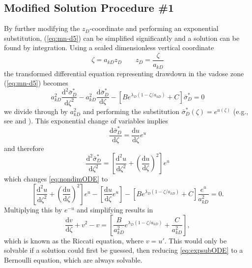 \documentclass[12pt,letterpaper]{article}
\begin{document}
\subsection{Modified Solution Procedure \#1} 
By further modifying the $z_D$-coordinate and performing an exponential substitution, (\ref{eq:mn-d5}) can be simplified significantly and a solution can be found by integration.  Using a scaled dimensionless vertical coordinate 
\begin{equation}\nonumber
 \zeta= a_{kD} z_D \qquad z_D=\frac{\zeta}{a_{kD}} 
\end{equation}
the transformed differential equation representing drawdown in the vadose zone (\ref{eq:mn-d5}) becomes
\begin{equation}
  \label{eq:nondimODE}
  a_{kD}^2 \frac{\mathrm{d}^2
    \bar{\sigma}_D^{\ast}}{\mathrm{d}\zeta^2} - a_{kD}^2
  \frac{\mathrm{d} \bar{\sigma}_D^{\ast}}{\mathrm{d}\zeta} - \left[
    B e^{\lambda_D (1-\zeta/a_{kD})} + C\right] \bar{\sigma}_D^{\ast}=0
\end{equation}
we divide through by $a_{kD}^2$ and performing the substitution
$\bar{\sigma}_D^{\ast}(\zeta)=e^{u(\zeta)}$ (e.g., see \cite[p.\ 27]{bender1978advanced} and \cite[\S 60]{zwillinger1998handbook}).  This exponential change of variables implies
\begin{equation}\nonumber
\frac{\mathrm{d}\bar{\sigma}_D^{\ast}}{\mathrm{d}\zeta} =
\frac{\mathrm{d}u}{\mathrm{d}\zeta}e^u
\end{equation} 
and therefore
\begin{equation}\nonumber
\frac{\mathrm{d}^2\bar{\sigma}_D^{\ast}}{\mathrm{d}\zeta^2} =
\left[ \frac{\mathrm{d}^2u}{\mathrm{d}\zeta^2} +
\left(\frac{\mathrm{d}u}{\mathrm{d}\zeta}\right)^2 \right]e^u
\end{equation}
which changes \eqref{eq:nondimODE} to
\begin{equation}\nonumber
 \left[ \frac{\mathrm{d}^2u}{\mathrm{d}\zeta^2} +
  \left(\frac{\mathrm{d}u}{\mathrm{d}\zeta}\right)^2 \right]e^u -  \left[
  \frac{\mathrm{d}u}{\mathrm{d}\zeta}e^u \right]- \left[ B e^{\lambda_D (1-\zeta/a_{kD})} + C\right] \frac{e^{u}}{a_{kD}^2} =0.
\end{equation}
Multiplying this by $e^{-u}$ and simplifying results in
\begin{equation}
  \label{eq:expsubODE}
   \frac{\mathrm{d} v}{\mathrm{d}\zeta} + v^2 - v = \left[ \frac{B}{a_{kD}^2} e^{\lambda_D (1-\zeta/a_{kD})} + \frac{C}{a_{kD}^2}\right],
\end{equation}
which is known as the Riccati equation, where $v=u'$.  This would only be solvable if a solution could first be guessed, then reducing \eqref{eq:expsubODE} to a Bernoulli equation, which are always solvable.
\end{document}
